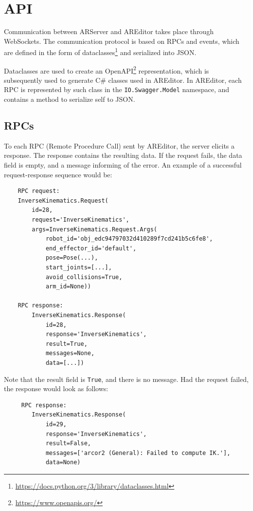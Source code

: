 \section{API}
Communication between ARServer and AREditor takes place through WebSockets. The communication protocol is based on RPCs and events, which are defined in the form of dataclasses\footnote{\url{https://docs.python.org/3/library/dataclasses.html}} and serialized into JSON.

Dataclasses are used to create an OpenAPI\footnote{\href{https://www.openapis.org/}{https://www.openapis.org/}} representation, which is subsequently used to generate C\# classes used in AREditor. In AREditor, each RPC is represented by such class in the \texttt{IO.Swagger.Model} namespace, and contains a method to serialize self to JSON.

\subsection{RPCs}
To each RPC (Remote Procedure Call) sent by AREditor, the server elicits a response. The response contains the resulting data. If the request fails, the data field is empty, and a message informing of the error. An example of a successful request-response sequence would be: 
\begin{verbatim}
    RPC request: 
    InverseKinematics.Request(
        id=28, 
        request='InverseKinematics', 
        args=InverseKinematics.Request.Args(
            robot_id='obj_edc94797032d410289f7cd241b5c6fe8', 
            end_effector_id='default', 
            pose=Pose(...), 
            start_joints=[...], 
            avoid_collisions=True, 
            arm_id=None)) 
    
    RPC response:
        InverseKinematics.Response(
            id=28, 
            response='InverseKinematics', 
            result=True, 
            messages=None, 
            data=[...])
\end{verbatim}

Note that the result field is \texttt{True}, and there is no message. Had the request failed, the response would look as follows:

\begin{verbatim}
     RPC response:
        InverseKinematics.Response(
            id=29, 
            response='InverseKinematics', 
            result=False, 
            messages=['arcor2 (General): Failed to compute IK.'], 
            data=None)
\end{verbatim}

